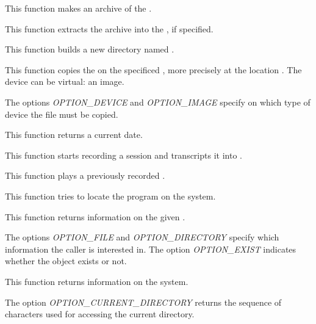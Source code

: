          {
	   This function makes an archive  of the
	   .
	 }

         {
	   This function extracts the archive  into the
	   , if specified.
	 }

         {
	   This function builds a new directory named .
	 }

         {
	   This function copies the  on the specificed
	   , more precisely at the location .
	   The device can be virtual: an image.

	   \-

	   The options \textit{OPTION\_DEVICE} and \textit{OPTION\_IMAGE}
	   specify on which type of device the file must be copied.
	 }

         {
	   This function returns a current date.
	 }

         {
	   This function starts recording a session and transcripts it
           into .
	 }

         {
	   This function plays a previously recorded .
	 }

         {
	   This function tries to locate the program 
	   on the system.
	 }

         {
	   This function returns information on the given .

	   \-

	   The options \textit{OPTION\_FILE} and \textit{OPTION\_DIRECTORY}
	   specify which information the caller is interested in. The option
           \textit{OPTION\_EXIST} indicates whether the  object
           exists or not.
	 }

         {
	   This function returns information on the system.

	   \-

	   The option \textit{OPTION\_CURRENT\_DIRECTORY} returns the
           sequence of characters used for accessing the current directory.
	 }
